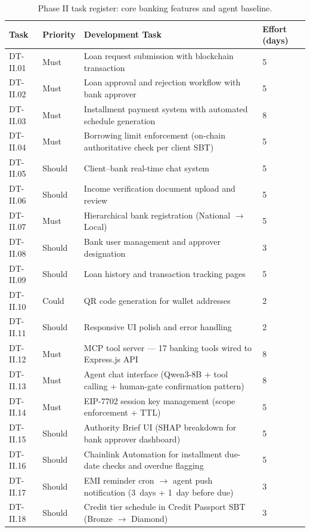 \documentclass[12pt,a4paper]{report}
\begin{document}
\begin{table}[H]
\centering
\caption{Phase II task register: core banking features and agent baseline.}
\label{tab:phaseII}
\small
\begin{tabular}{p{1.8cm}p{1.8cm}p{7.5cm}p{1.5cm}}
\hline
\textbf{Task} & \textbf{Priority} & \textbf{Development Task} & \textbf{Effort (days)} \\
\hline
DT-II.01 & Must & Loan request submission with blockchain transaction & 5 \\
DT-II.02 & Must & Loan approval and rejection workflow with bank approver & 5 \\
DT-II.03 & Must & Installment payment system with automated schedule generation & 8 \\
DT-II.04 & Must & Borrowing limit enforcement (on-chain authoritative check per client SBT) & 5 \\
DT-II.05 & Should & Client--bank real-time chat system & 5 \\
DT-II.06 & Should & Income verification document upload and review & 5 \\
DT-II.07 & Must & Hierarchical bank registration (National $\to$ Local) & 5 \\
DT-II.08 & Should & Bank user management and approver designation & 3 \\
DT-II.09 & Should & Loan history and transaction tracking pages & 5 \\
DT-II.10 & Could & QR code generation for wallet addresses & 2 \\
DT-II.11 & Should & Responsive UI polish and error handling & 2 \\
DT-II.12 & Must & MCP tool server --- 17 banking tools wired to Express.js API & 8 \\
DT-II.13 & Must & Agent chat interface (Qwen3-8B + tool calling + human-gate confirmation pattern) & 8 \\
DT-II.14 & Must & EIP-7702 session key management (scope enforcement + TTL) & 5 \\
DT-II.15 & Should & Authority Brief UI (SHAP breakdown for bank approver dashboard) & 5 \\
DT-II.16 & Should & Chainlink Automation for installment due-date checks and overdue flagging & 5 \\
DT-II.17 & Should & EMI reminder cron $\to$ agent push notification (3~days + 1~day before due) & 3 \\
DT-II.18 & Should & Credit tier schedule in Credit Passport SBT (Bronze $\to$ Diamond) & 3 \\

\end{tabular}
\end{table}
\end{document}
